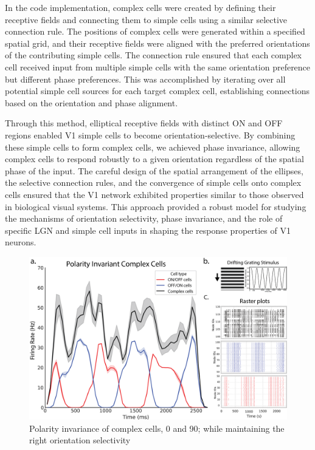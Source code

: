 \documentclass[12pt]{article}
\begin{document}
In the code implementation, complex cells were created by defining their receptive fields and connecting them to simple cells using a similar selective connection rule. The positions of complex cells were generated within a specified spatial grid, and their receptive fields were aligned with the preferred orientations of the contributing simple cells. The connection rule ensured that each complex cell received input from multiple simple cells with the same orientation preference but different phase preferences. This was accomplished by iterating over all potential simple cell sources for each target complex cell, establishing connections based on the orientation and phase alignment.

Through this method, elliptical receptive fields with distinct ON and OFF regions enabled V1 simple cells to become orientation-selective. By combining these simple cells to form complex cells, we achieved phase invariance, allowing complex cells to respond robustly to a given orientation regardless of the spatial phase of the input. The careful design of the spatial arrangement of the ellipses, the selective connection rules, and the convergence of simple cells onto complex cells ensured that the V1 network exhibited properties similar to those observed in biological visual systems. This approach provided a robust model for studying the mechanisms of orientation selectivity, phase invariance, and the role of specific LGN and simple cell inputs in shaping the response properties of V1 neurons.


\begin{figure}[H]
    \centering
    \includegraphics[width=1 \textwidth]{figures/complex_invariance_figure.png}
    \caption{Polarity invariance of complex cells, 0 and 90; while maintaining the right orientation selectivity}
    \label{fig:polarity invariance}
\end{figure}
\end{document}
